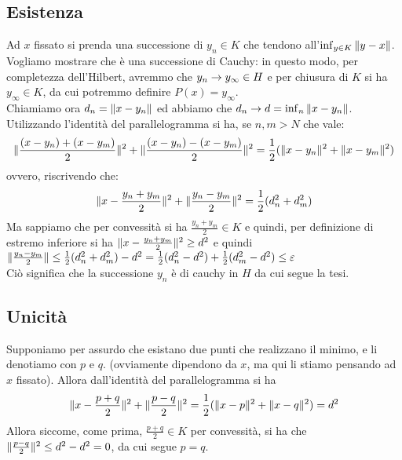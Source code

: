 \documentclass[a4paper,NoNotes,GeneralMath]{stdmdoc}
\begin{document}
	\subsection*{Esistenza}
	Ad $x$ fissato si prenda una successione di $y_n \in K$ che tendono all'$\inf_{y \in K} \| {y - x} \|$. Vogliamo mostrare che è una successione di Cauchy: in questo modo, per completezza dell'Hilbert, avremmo che $y_n \rightarrow y_\infty \in H$ e per chiusura di $K$ si ha $y_\infty \in K$, da cui potremmo definire $P(x) = y_\infty$. \\
    Chiamiamo ora $d_n = \| {x - y_n} \|$ ed abbiamo che $d_n \rightarrow d = \inf_n \| {x - y_n} \|$. Utilizzando l'identità del parallelogramma si ha, se $n, m > N$ che vale:
    $$ \| {\frac{(x - y_n) + (x - y_m)}{2}} \|^2 + \| {\frac{(x - y_n) - (x - y_m)}{2}} \|^2 = \frac{1}{2} ( \| {x - y_n} \|^2 + \| {x - y_m} \|^2) $$
    ovvero, riscrivendo che:
    $$ \| {x - \frac{y_n + y_m}{2}} \|^2 + \| {\frac{y_n - y_m}{2}} \|^2 = \frac{1}{2}(d_n^2 + d_m^2) $$
    Ma sappiamo che per convessità si ha $\frac{y_n + y_m}{2} \in K$ e quindi, per definizione di estremo inferiore si ha $\| {x - \frac{y_n + y_m}{2}} \|^2 \ge d^2$ e quindi $\| {\frac{y_n - y_m}{2}} \| \le \frac{1}{2}(d_n^2 + d_m^2) - d^2 = \frac{1}{2}(d_n^2 - d^2) + \frac{1}{2}(d_m^2 - d^2) \le \varepsilon$ \\
    Ciò significa che la successione $y_n$ è di cauchy in $H$ da cui segue la tesi.
    
    \subsection*{Unicità}
    Supponiamo per assurdo che esistano due punti che realizzano il minimo, e li denotiamo con $p$ e $q$. (ovviamente dipendono da $x$, ma qui li stiamo pensando ad $x$ fissato). Allora dall'identità del parallelogramma si ha
    $$ \| {x - \frac{p + q}{2}} \|^2 + \| {\frac{p - q}{2}} \|^2 = \frac{1}{2} (\| {x - p} \|^2 + \| {x - q} \|^2) = d^2 $$
    Allora siccome, come prima, $\frac{p + q}{2} \in K$ per convessità, si ha che $\| {\frac{p - q}{2}} \|^2 \le d^2 - d^2 = 0$, da cui segue $p = q$.
    
\end{document}
